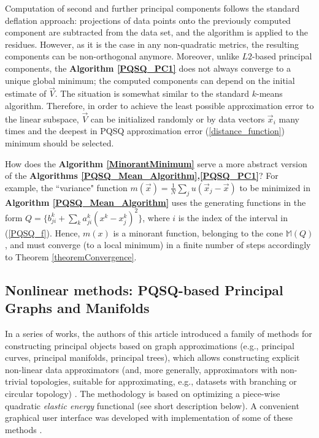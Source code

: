 \documentclass[preprint,12pt,twocolumn]{elsarticle}
\begin{document}
Computation of second and further principal components follows the standard deflation approach: projections of data points onto the previously computed component are subtracted from the data set, and the algorithm is applied to the residues. However, as it is the case in any non-quadratic metrics, the resulting components can be non-orthogonal anymore.
Moreover, unlike $L2$-based principal components, the \textbf{Algorithm \ref{PQSQ_PC1}} does not always converge to a unique global minimum; the computed components can depend on the initial estimate of $\vec{V}$. The situation is somewhat similar to the standard $k$-means algorithm. Therefore, in order to achieve the least possible approximation error to the linear subspace, $\vec{V}$ can be initialized randomly or by data vectors $\vec{x}_i$ many times and the deepest in PQSQ approximation error (\ref{distance_function}) minimum should be selected.

How does the \textbf{Algorithm \ref{MinorantMinimum}} serve a more abstract version of the \textbf{Algorithms \ref{PQSQ_Mean_Algorithm},\ref{PQSQ_PC1}}? For example, the ``variance" function $m(\vec{x})=\frac{1}{N}\sum_j u(\vec{x}_j-\vec{x})$ to be minimized in \textbf{Algorithm \ref{PQSQ_Mean_Algorithm}} uses the generating functions in the form $Q = \{b_{ji}^k+\sum_k a_{ji}^k(x^k-x_j^k)^2\}$, where $i$ is the index of the interval in (\ref{PQSQ_f}). Hence, $m(x)$ is a minorant function, belonging to the cone $\mathbb{M}(Q)$, and must converge (to a local minimum) in a finite number of steps accordingly to Theorem \ref{theoremConvergence}.


\subsection{Nonlinear methods: PQSQ-based Principal Graphs and Manifolds}

In a series of works, the authors of this article introduced a family of methods
for constructing principal objects
based on graph approximations (e.g., principal curves, principal manifolds, principal trees),
which allows constructing explicit non-linear data approximators
(and, more generally, approximators with non-trivial topologies, suitable for approximating,
e.g., datasets with branching or circular topology) \cite{Gorban1999, Gorban2001ihespreprint, gorban2001method, gorban2005elastic, gorban2007topological,Gorban2008Principal,Gorban2009,Gorban2010}. The methodology is
based on optimizing a piece-wise quadratic {\it elastic energy} functional (see short description below).
A convenient graphical user interface was developed with
implementation of some of these methods \cite{Gorban2014}.
\end{document}
